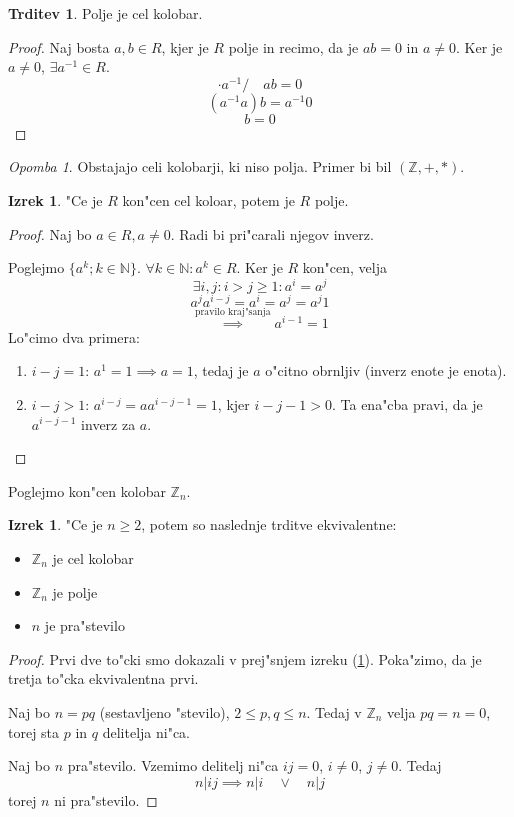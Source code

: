 \documentclass[11pt, a4paper]{article}
\theoremstyle{definition}
\newtheorem{claim}[counter]{Trditev}
\newtheorem{theorem}[counter]{Izrek}
\theoremstyle{remark}
\newtheorem*{rem}{Opomba}
\newcommand{\N}{\mathbb{N}}
\newcommand{\Z}{\mathbb{Z}}
\begin{document}
	\begin{claim}
		Polje je cel kolobar.
	\end{claim}
	\begin{proof}
		Naj bosta $a,b \in R$, kjer je $R$ polje in recimo, da je $ab = 0$ in $a \neq 0$. Ker je $a \neq 0$, $\exists a^{-1} \in R$.
		\[ \cdot a^{-1} / \quad ab = 0 \]
		\[ (a^{-1}a)b = a^{-1}0 \]
		\[ b = 0 \]
	\end{proof}

	\begin{rem}
		Obstajajo celi kolobarji, ki niso polja. Primer bi bil $(\Z, +, *)$.
	\end{rem}

	\begin{theorem}\label{koncen_cel_kolobar_je_polje}
		"Ce je $R$ kon"cen cel koloar, potem je $R$ polje.
	\end{theorem}
	\begin{proof}
		Naj bo $a \in R, a \neq 0$. Radi bi pri"carali njegov inverz.
		
		Poglejmo $ \lbrace a^k; k \in \N \rbrace $.
		$ \forall k \in \N: a^k \in R $. Ker je $R$ kon"cen, velja
		\[ \exists i,j: i > j \geq 1: a^i = a^j \]
		\[ a^j a^{i-j} = a^i = a^j = a^j 1 \]
		\[ \overset{\text{pravilo kraj"sanja}}{\implies} a^{i-1} = 1\]
		Lo"cimo dva primera:
		\begin{enumerate}
			\item $i-j = 1$: $a^1 = 1 \implies a = 1$, tedaj je $a$ o"citno obrnljiv (inverz enote je enota).
			
			\item $i - j > 1$: $a^{i-j} = a a^{i-j-1} = 1$, kjer $i-j-1 > 0$. Ta ena"cba pravi, da je $a^{i-j-1}$ inverz za $a$.
		\end{enumerate}
	\end{proof}
	
	Poglejmo kon"cen kolobar $\Z_n$.
	\begin{theorem}
		"Ce je $n \geq 2$, potem so naslednje trditve ekvivalentne:
		\begin{itemize}
			\item $\Z_n$ je cel kolobar
			\item $\Z_n$ je polje
			\item $n$ je pra"stevilo
		\end{itemize}
	\end{theorem}
	\begin{proof}
		Prvi dve to"cki smo dokazali v prej"snjem izreku (\ref{koncen_cel_kolobar_je_polje}). Poka"zimo, da je tretja to"cka ekvivalentna prvi.
		
		Naj bo $n = pq$ (sestavljeno "stevilo), $2 \leq p,q \leq n$. Tedaj v $\Z_n$ velja $pq = n = 0$, torej sta $p$ in $q$ delitelja ni"ca.
		
		Naj bo $n$ pra"stevilo. Vzemimo delitelj ni"ca $ij=0$, $i \neq 0$, $j \neq 0$. Tedaj
		\[ n | ij \implies n | i \quad \lor \quad n | j \]
		torej $n$ ni pra"stevilo.
	\end{proof}
\end{document}
